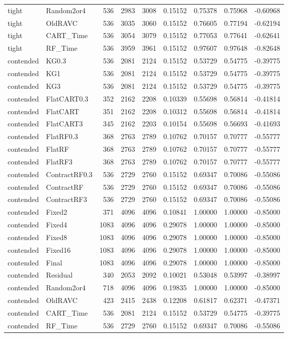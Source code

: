\begin{longtable}{@{}llrrrrrrr@{}}
tight & Random2or4 & 536 & 2983 & 3008 & 0.15152 & 0.75378 & 0.75968 & -0.60968\\
tight & OldRAVC & 536 & 3035 & 3060 & 0.15152 & 0.76605 & 0.77194 & -0.62194\\
tight & CART\_Time & 536 & 3054 & 3079 & 0.15152 & 0.77053 & 0.77641 & -0.62641\\
tight & RF\_Time & 536 & 3959 & 3961 & 0.15152 & 0.97607 & 0.97648 & -0.82648\\
contended & KG0.3 & 536 & 2081 & 2124 & 0.15152 & 0.53729 & 0.54775 & -0.39775\\
contended & KG1 & 536 & 2081 & 2124 & 0.15152 & 0.53729 & 0.54775 & -0.39775\\
contended & KG3 & 536 & 2081 & 2124 & 0.15152 & 0.53729 & 0.54775 & -0.39775\\
contended & FlatCART0.3 & 352 & 2162 & 2208 & 0.10339 & 0.55698 & 0.56814 & -0.41814\\
contended & FlatCART & 351 & 2162 & 2208 & 0.10312 & 0.55698 & 0.56814 & -0.41814\\
contended & FlatCART3 & 345 & 2162 & 2203 & 0.10154 & 0.55698 & 0.56693 & -0.41693\\
contended & FlatRF0.3 & 368 & 2763 & 2789 & 0.10762 & 0.70157 & 0.70777 & -0.55777\\
contended & FlatRF & 368 & 2763 & 2789 & 0.10762 & 0.70157 & 0.70777 & -0.55777\\
contended & FlatRF3 & 368 & 2763 & 2789 & 0.10762 & 0.70157 & 0.70777 & -0.55777\\
contended & ContractRF0.3 & 536 & 2729 & 2760 & 0.15152 & 0.69347 & 0.70086 & -0.55086\\
contended & ContractRF & 536 & 2729 & 2760 & 0.15152 & 0.69347 & 0.70086 & -0.55086\\
contended & ContractRF3 & 536 & 2729 & 2760 & 0.15152 & 0.69347 & 0.70086 & -0.55086\\
contended & Fixed2 & 371 & 4096 & 4096 & 0.10841 & 1.00000 & 1.00000 & -0.85000\\
contended & Fixed4 & 1083 & 4096 & 4096 & 0.29078 & 1.00000 & 1.00000 & -0.85000\\
contended & Fixed8 & 1083 & 4096 & 4096 & 0.29078 & 1.00000 & 1.00000 & -0.85000\\
contended & Fixed16 & 1083 & 4096 & 4096 & 0.29078 & 1.00000 & 1.00000 & -0.85000\\
contended & Final & 1083 & 4096 & 4096 & 0.29078 & 1.00000 & 1.00000 & -0.85000\\
contended & Residual & 340 & 2053 & 2092 & 0.10021 & 0.53048 & 0.53997 & -0.38997\\
contended & Random2or4 & 718 & 4096 & 4096 & 0.19835 & 1.00000 & 1.00000 & -0.85000\\
contended & OldRAVC & 423 & 2415 & 2438 & 0.12208 & 0.61817 & 0.62371 & -0.47371\\
contended & CART\_Time & 536 & 2081 & 2124 & 0.15152 & 0.53729 & 0.54775 & -0.39775\\
contended & RF\_Time & 536 & 2729 & 2760 & 0.15152 & 0.69347 & 0.70086 & -0.55086\\
\bottomrule\end{longtable}\normalsize

